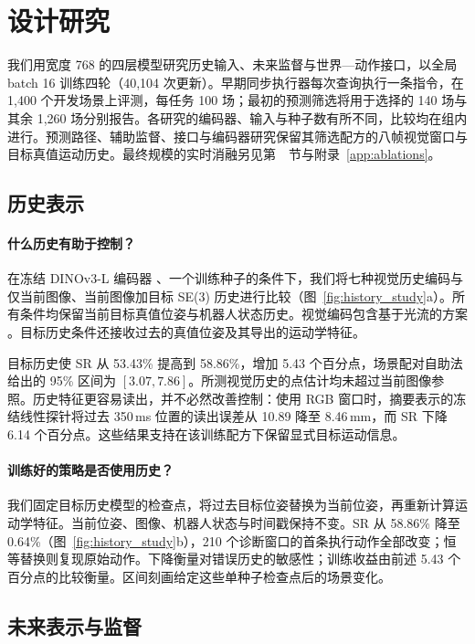 \section{设计研究}
\label{app:design}
\suppressfloats[t]
我们用宽度 768 的四层模型研究历史输入、未来监督与世界—动作接口，以全局 batch 16 训练四轮（40{,}104 次更新）。早期同步执行器每次查询执行一条指令，在 1{,}400 个开发场景上评测，每任务 100 场；最初的预测筛选将用于选择的 140 场与其余 1{,}260 场分别报告。各研究的编码器、输入与种子数有所不同，比较均在组内进行。预测路径、辅助监督、接口与编码器研究保留其筛选配方的八帧视觉窗口与目标真值运动历史。最终规模的实时消融另见第~~节与附录~\ref{app:ablations}。

\subsection{历史表示}
\label{app:design_remember}


\paragraph{什么历史有助于控制？}
在冻结 DINOv3-L 编码器 \cite{dinov3}、一个训练种子的条件下，我们将七种视觉历史编码与仅当前图像、当前图像加目标 SE(3) 历史进行比较（图~\ref{fig:history_study}a）。所有条件均保留当前目标真值位姿与机器人状态历史。视觉编码包含基于光流的方案 \cite{farneback,dynamicwam}。目标历史条件还接收过去的真值位姿及其导出的运动学特征。

目标历史使 SR 从 53.43\% 提高到 58.86\%，增加 5.43 个百分点，场景配对自助法给出的 95\% 区间为 $[3.07,7.86]$。所测视觉历史的点估计均未超过当前图像参照。历史特征更容易读出，并不必然改善控制：使用 RGB 窗口时，摘要表示的冻结线性探针将过去 350\,ms 位置的读出误差从 10.89 降至 8.46\,mm，而 SR 下降 6.14 个百分点。这些结果支持在该训练配方下保留显式目标运动信息。

\paragraph{训练好的策略是否使用历史？}
我们固定目标历史模型的检查点，将过去目标位姿替换为当前位姿，再重新计算运动学特征。当前位姿、图像、机器人状态与时间戳保持不变。SR 从 58.86\% 降至 0.64\%（图~\ref{fig:history_study}b），210 个诊断窗口的首条执行动作全部改变；恒等替换则复现原始动作。下降衡量对错误历史的敏感性；训练收益由前述 5.43 个百分点的比较衡量。区间刻画给定这些单种子检查点后的场景变化。

\subsection{未来表示与监督}
\label{app:design_predict}


